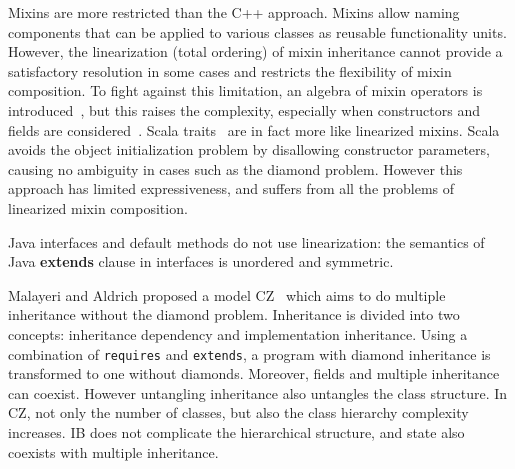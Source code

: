 Mixins are more restricted than the C++ approach. Mixins allow naming
components that can be applied to various classes as reusable functionality
units. However, %
the linearization (total ordering) of
mixin inheritance cannot provide a satisfactory resolution in some cases and
restricts the flexibility of mixin composition. To fight against this limitation, an
algebra of mixin operators is introduced~\cite{ancona2002calculus}, but this
raises the complexity, especially when constructors and fields
are considered~\cite{marco09FJigsaw}. Scala traits~\cite{scala-overview} are in fact more like linearized mixins.
Scala avoids the object initialization
problem by disallowing constructor parameters, causing no ambiguity in cases
such as the diamond problem. However this approach has limited expressiveness, and
suffers from all the problems of linearized mixin composition. %
\begin{comment}
Python also offers multiple inheritance via linearized mixins. Indeed, in python any class is implicitly a mixin, and mixin composition informally expressed as\\*
\Q@ class A use B,C {...new methods...}@\\*
can be expressed in python as \\*
\Q@ class Aux: ...new methods...@\\*
\Q@ class A(B,C,Aux): pass@
\end{comment}
\noindent Java interfaces and default methods do not use
linearization: the semantics of Java \textbf{extends} clause in
interfaces is unordered and symmetric.


Malayeri and Aldrich proposed a model CZ~\cite{malayeri2009cz} which
aims to do multiple inheritance without the diamond problem.
Inheritance is divided into two concepts: inheritance dependency
and implementation inheritance. Using a combination of
\texttt{requires} and \texttt{extends}, a program with diamond
inheritance is transformed to one without diamonds. Moreover,
fields and multiple inheritance can coexist. However untangling
inheritance also untangles the class structure. In CZ, not only the
number of classes, but also the class hierarchy complexity
increases. IB does not complicate the hierarchical structure, and state
also coexists with multiple inheritance.

